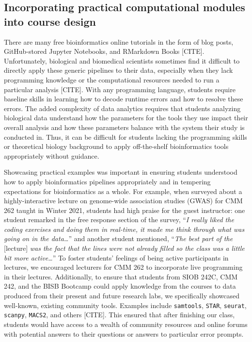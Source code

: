 \subsection{Incorporating practical computational modules into course design}

There are many free bioinformatics online tutorials in the form of blog posts, GitHub-stored Jupyter Notebooks, and RMarkdown Books [CITE]. Unfortunately, biological and biomedical scientists sometimes find it difficult to directly apply these generic pipelines to their data, especially when they lack programming knowledge or the computational resources needed to run a particular analysis [CITE]. With any programming language, students require baseline skills in learning how to decode runtime errors and how to resolve these errors. The added complexity of data analytics requires that students analyzing biological data understand how the parameters for the tools they use impact their overall analysis and how these parameters balance with the system their study is conducted in. Thus, it can be difficult for students lacking the programming skills or theoretical biology background to apply off-the-shelf bioinformatics tools appropriately without guidance. 

Showcasing practical examples was important in ensuring students understood how to apply bioinformatics pipelines appropriately and in tempering expectations for bioinformatics as a whole. For example, when surveyed about a highly-interactive lecture on genome-wide association studies (GWAS) for CMM 262 taught in Winter 2021, students had high praise for the guest instructor: one student remarked in the free response section of the survey, “\textit{I really liked the coding exercises and doing them in real-time, it made me think through what was going on in the data…}” and another student mentioned, “\textit{The best part of the} [lecture] \textit{was the fact that the lines were not already filled so the class was a little bit more active…}” To foster students’ feelings of being active participants in lectures, we encouraged lecturers for CMM 262 to incorporate live programming in their lectures. Additionally, to ensure that students from SIOB 242C, CMM 242, and the BISB Bootcamp could apply knowledge from the courses to data produced from their present and future research labs, we specifically showcased well-known, existing community tools. Examples include \verb|samtools|, \verb|STAR|, \verb|seurat|, \verb|scanpy|, \verb|MACS2|, and others [CITE]. This ensured that after finishing our class, students would have access to a wealth of community resources and online forums with potential answers to their questions or answers to particular error prompts.

